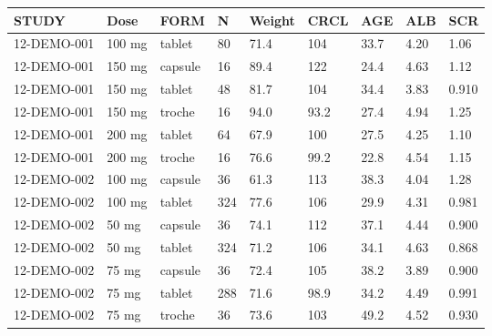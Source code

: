 \documentclass[
]{article}
\newenvironment{Shaded}{\begin{snugshade}}{\end{snugshade}}
\newcommand{\ControlFlowTok}[1]{\textcolor[rgb]{0.13,0.29,0.53}{\textbf{#1}}}
\newcommand{\DataTypeTok}[1]{\textcolor[rgb]{0.13,0.29,0.53}{#1}}
\newcommand{\KeywordTok}[1]{\textcolor[rgb]{0.13,0.29,0.53}{\textbf{#1}}}
\newcommand{\NormalTok}[1]{#1}
\newcommand{\OperatorTok}[1]{\textcolor[rgb]{0.81,0.36,0.00}{\textbf{#1}}}
\newcommand{\StringTok}[1]{\textcolor[rgb]{0.31,0.60,0.02}{#1}}
\begin{document}
\begin{table}[h]
\centering
{\def\arraystretch{1.4}\tabcolsep=5pt
\begin{threeparttable}
\begin{tabular}[h]{lllllllll}
\hline
STUDY & Dose & FORM & N & Weight & CRCL & AGE & ALB & SCR \\
\hline
12-DEMO-001 & 100 mg & tablet & 80 & 71.4 & 104 & 33.7 & 4.20 & 1.06 \\
12-DEMO-001 & 150 mg & capsule & 16 & 89.4 & 122 & 24.4 & 4.63 & 1.12 \\
12-DEMO-001 & 150 mg & tablet & 48 & 81.7 & 104 & 34.4 & 3.83 & 0.910 \\
12-DEMO-001 & 150 mg & troche & 16 & 94.0 & 93.2 & 27.4 & 4.94 & 1.25 \\
12-DEMO-001 & 200 mg & tablet & 64 & 67.9 & 100 & 27.5 & 4.25 & 1.10 \\
12-DEMO-001 & 200 mg & troche & 16 & 76.6 & 99.2 & 22.8 & 4.54 & 1.15 \\
12-DEMO-002 & 100 mg & capsule & 36 & 61.3 & 113 & 38.3 & 4.04 & 1.28 \\
12-DEMO-002 & 100 mg & tablet & 324 & 77.6 & 106 & 29.9 & 4.31 & 0.981 \\
12-DEMO-002 & 50 mg & capsule & 36 & 74.1 & 112 & 37.1 & 4.44 & 0.900 \\
12-DEMO-002 & 50 mg & tablet & 324 & 71.2 & 106 & 34.1 & 4.63 & 0.868 \\
12-DEMO-002 & 75 mg & capsule & 36 & 72.4 & 105 & 38.2 & 3.89 & 0.900 \\
12-DEMO-002 & 75 mg & tablet & 288 & 71.6 & 98.9 & 34.2 & 4.49 & 0.991 \\
12-DEMO-002 & 75 mg & troche & 36 & 73.6 & 103 & 49.2 & 4.52 & 0.930 \\
\hline
\end{tabular}
\end{threeparttable}
}
\end{table}

\begin{Shaded}
\end{Shaded}

\clearpage
\end{document}

